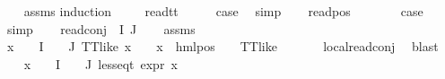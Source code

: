 \begin{isabellebody}
%
\isadelimproof
\ \ %
\endisadelimproof
%
\isatagproof
{}\isamarkupfalse%
\ assms\isanewline
{}\isamarkupfalse%
{\isacharparenleft}{\kern0pt}induction\ {\isasymphi}{\isacharparenright}{\kern0pt}\isanewline
\ \ \isamarkupfalse%
\ read{\isacharunderscore}{\kern0pt}tt\isanewline
\ \ \isamarkupfalse%
\ \isamarkupfalse%
\ {\isacharquery}{\kern0pt}case\ \isamarkupfalse%
\ simp\isanewline
{}\isamarkupfalse%
\isanewline
\ \ \isamarkupfalse%
\ {\isacharparenleft}{\kern0pt}read{\isacharunderscore}{\kern0pt}pos\ {\isasymphi}\ {\isasymalpha}{\isacharparenright}{\kern0pt}\isanewline
\ \ \isamarkupfalse%
\ \isamarkupfalse%
\ {\isacharquery}{\kern0pt}case\isanewline
\ \ \ \ \isamarkupfalse%
\ simp\isanewline
{}\isamarkupfalse%
\isanewline
\ \ \isamarkupfalse%
\ {\isacharparenleft}{\kern0pt}read{\isacharunderscore}{\kern0pt}conj\ {\isasymPhi}\ I\ J{\isacharparenright}{\kern0pt}\isanewline
\ \ \isamarkupfalse%
\ assms\ \isamarkupfalse%
\ {\isachardoublequoteopen}{\isacharparenleft}{\kern0pt}{\isasymforall}x\ {\isasymin}\ {\isacharparenleft}{\kern0pt}{\isasymPhi}\ {\isacharbackquote}{\kern0pt}\ I{\isacharparenright}{\kern0pt}\ {\isasymunion}\ {\isacharparenleft}{\kern0pt}{\isasymPhi}\ {\isacharbackquote}{\kern0pt}\ J{\isacharparenright}{\kern0pt}{\isachardot}{\kern0pt}\ TT{\isacharunderscore}{\kern0pt}like\ x\ {\isasymor}\ {\isacharparenleft}{\kern0pt}{\isasymexists}{\isasymalpha}\ {\isasymchi}{\isachardot}{\kern0pt}\ x\ {\isacharequal}{\kern0pt}\ hml{\isacharunderscore}{\kern0pt}pos\ {\isasymalpha}\ {\isasymchi}\ {\isasymand}\ TT{\isacharunderscore}{\kern0pt}like\ {\isasymchi}{\isacharparenright}{\kern0pt}{\isacharparenright}{\kern0pt}{\isachardoublequoteclose}\isanewline
\ \ \ \ \isamarkupfalse%
\ local{\isachardot}{\kern0pt}read{\isacharunderscore}{\kern0pt}conj\ \isamarkupfalse%
\ blast\isanewline
\ \ \isamarkupfalse%
\ {\isachardoublequoteopen}{\isacharparenleft}{\kern0pt}{\isasymforall}x\ {\isasymin}\ {\isacharparenleft}{\kern0pt}{\isasymPhi}\ {\isacharbackquote}{\kern0pt}\ I{\isacharparenright}{\kern0pt}\ {\isasymunion}\ {\isacharparenleft}{\kern0pt}{\isasymPhi}\ {\isacharbackquote}{\kern0pt}\ J{\isacharparenright}{\kern0pt}{\isachardot}{\kern0pt}\ less{\isacharunderscore}{\kern0pt}eq{\isacharunderscore}{\kern0pt}t\ {\isacharparenleft}{\kern0pt}expr\ x{\isacharparenright}{\kern0pt}\ {\isacharparenleft}{\kern0pt}{}{\isacharcomma}{\kern0pt}\ {}{\isacharcomma}{\kern0pt}\ {}{\isacharcomma}{\kern0pt}\ {}{\isacharcomma}{\kern0pt}\ {}{\isacharcomma}{\kern0pt}\ {}{\isacharparenright}{\kern0pt}{\isacharparenright}{\kern0pt}{\isachardoublequoteclose}\isanewline

\end{isabellebody}

